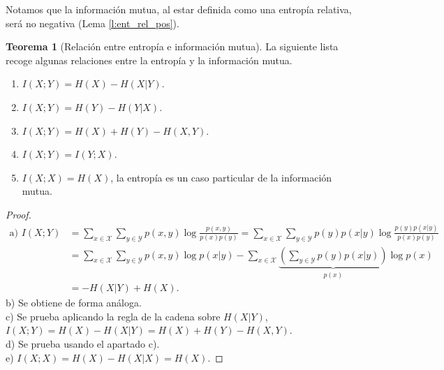 \documentclass[10pt,a4paper]{article} %
\theoremstyle{definition}
\newtheorem{theorem}{Teorema}[section]
\begin{document}
Notamos que la información mutua, al estar definida como una entropía relativa, será no negativa (Lema \ref{l:ent_rel_pos}).

\begin{theorem}[Relación entre entropía e información mutua]\label{t:ent_im}
  La siguiente lista recoge algunas relaciones entre la entropía y la información mutua.
\begin{enumerate}[label={\alph*)}]
  \item $I(X;Y) = H(X) - H(X|Y)$.
  \item $I(X;Y) = H(Y) - H(Y|X)$.
  \item $I(X;Y) = H(X) + H(Y) - H(X,Y)$.
  \item $I(X;Y) = I(Y;X)$.
  \item $I(X;X) = H(X)$, la entropía es un caso particular de la información mutua.
  \end{enumerate}
\end{theorem}
\begin{proof}
   
  \begin{align*}
    \text{a) }I(X;Y) &= \sum_{x \in \mathcal{X}}\sum_{y \in \mathcal{Y}}p(x,y) \log \frac{p(x,y)}{p(x)p(y)} = \sum_{x \in \mathcal{X}}\sum_{y \in \mathcal{Y}} p(y) p(x|y) \log \frac{p(y)p(x|y)}{p(x)p(y)}\\
    &= \sum_{x \in \mathcal{X}}\sum_{y \in \mathcal{Y}} p(x,y) \log p(x|y) - \sum_{x \in \mathcal{X}}\underbrace{\left ( \sum_{y \in \mathcal{Y}} p(y) p(x|y) \right)}_{p(x)} \log p(x)\\
    &= - H(X|Y) + H(X).
  \end{align*}
  b) Se obtiene de forma análoga.\\
  c) Se prueba aplicando la regla de la cadena sobre $H(X|Y)$, $I(X;Y) = H(X) - H(X|Y) = H(X) + H(Y) - H(X,Y)$.\\
  d) Se prueba usando el apartado c).\\
  e) $I(X;X) = H(X) - H(X|X) = H(X)$.
\end{proof}
\end{document}
